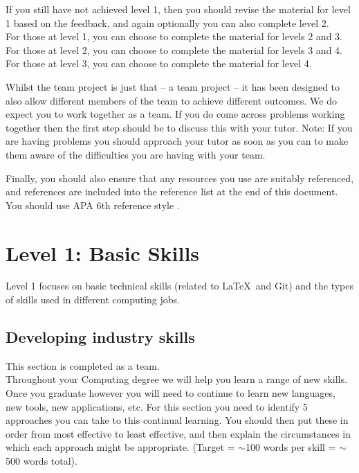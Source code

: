 \documentclass[a4paper, 11pt]{report}
\begin{document}
\begin{itemize}
    If you still have not achieved level 1, then you should revise the material for level 1 based on the feedback, and again optionally you can also complete level 2.\\
    For those at level 1, you can choose to complete the material for levels 2 and 3.\\
    For those at level 2, you can choose to complete the material for levels 3 and 4.\\
    For those at level 3, you can choose to complete the material for level 4.
\end{itemize}

Whilst the team project is just that -- a team project -- it has been designed to also allow different members of the team to achieve different outcomes. We do expect you to work together as a team. If you do come across problems working together then the first step should be to discuss this with your tutor. Note: If you are having problems you should approach your tutor as soon as you can to make them aware of the difficulties you are having with your team.

Finally, you should also ensure that any resources you use are suitably referenced, and references are included into the reference list at the end of this document. You should use APA 6th reference style \cite{apa6}.


\newpage
\section{Level 1: Basic Skills}

Level 1 focuses on basic technical skills (related to \LaTeX\ and Git) and the types of skills used in different computing jobs.

\subsection{Developing industry skills}

This section is completed as a team.\\
Throughout your Computing degree we will help you learn a range of new skills. Once you graduate however you will need to continue to learn new languages, new tools, new applications, etc. For this section you need to identify 5 approaches you can take to this continual learning. You should then put these in order from most effective to least effective, and then explain the circumstances in which each approach might be appropriate. (Target = $\sim$100 words per skill = $\sim$500 words total).\\
\end{document}
